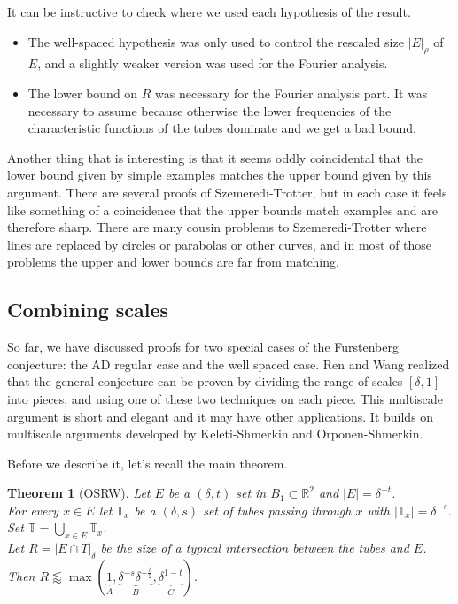\documentclass[12pt]{amsart}
\newtheorem{theorem}{Theorem}[section]
\newcommand{\RR}{\mathbb{R}}
\newcommand{\TT}{\mathbb{T}}
\begin{document}
It can be instructive to check where we used each hypothesis of the result.
\begin{itemize}
  \item The well-spaced hypothesis was only used to control the rescaled size $|E|_\rho$ of $E$, and a slightly weaker version was used for the Fourier analysis.
  \item The lower bound on $R$ was necessary for the Fourier analysis part. It was necessary to assume because otherwise the lower frequencies of the characteristic functions of the tubes dominate and we get a bad bound.
\end{itemize}

Another thing that is interesting is that it seems oddly coincidental that the lower bound given by simple examples matches the upper bound given 
by this argument.   There are several proofs of Szemeredi-Trotter,  but in each case it feels like something of a coincidence that the upper bounds match examples and are therefore sharp.   There are many cousin problems to Szemeredi-Trotter where lines are replaced by circles or parabolas or other curves,  and in most of those problems the upper and lower bounds are far from matching.  

\subsection{Combining scales}

So far,  we have discussed proofs for two special cases of the Furstenberg conjecture: the AD regular case and the well spaced case.   Ren and Wang realized that the general conjecture can be proven by dividing the range of scales $[\delta, 1]$ into pieces,  and using one of these two techniques on each piece.   This multiscale argument is short and elegant and it may have other applications.   It builds on multiscale arguments developed by Keleti-Shmerkin and Orponen-Shmerkin.  

Before we describe it,  let's recall the main theorem.

\begin{theorem}[OSRW]
  Let $E$ be a $(\delta, t)$ set in $B_1 \subset \RR^2$ and $|E| = \delta^{-t}$. \\
  For every $x \in E$ let $\TT_x$ be a $(\delta, s)$ set of tubes passing through $x$ with $|\TT_x| = \delta^{-s}$. Set $\TT = \bigcup_{x \in E} \TT_x$. \\
  Let $R = |E \cap T|_\delta$ be the size of a typical intersection between the tubes and $E$. \\
  Then $R \lessapprox \max(\underbrace{1}_{A}, \underbrace{\delta^{-s} \delta^{-\frac{t}{2}}}_{B}, \underbrace{\delta^{1-t}}_{C})$.
\end{theorem}
\end{document}
